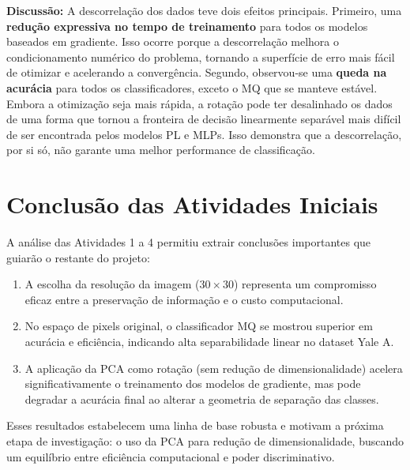 \documentclass[a4paper,12pt]{article}
\begin{document}
\noindent\textbf{Discussão:} A descorrelação dos dados teve dois efeitos principais. Primeiro, uma \textbf{redução expressiva no tempo de treinamento} para todos os modelos baseados em gradiente. Isso ocorre porque a descorrelação melhora o condicionamento numérico do problema, tornando a superfície de erro mais fácil de otimizar e acelerando a convergência. Segundo, observou-se uma \textbf{queda na acurácia} para todos os classificadores, exceto o MQ que se manteve estável. Embora a otimização seja mais rápida, a rotação pode ter desalinhado os dados de uma forma que tornou a fronteira de decisão linearmente separável mais difícil de ser encontrada pelos modelos PL e MLPs. Isso demonstra que a descorrelação, por si só, não garante uma melhor performance de classificação.

\section{Conclusão das Atividades Iniciais}

A análise das Atividades 1 a 4 permitiu extrair conclusões importantes que guiarão o restante do projeto:
\begin{enumerate}
    \item A escolha da resolução da imagem (\(30\times 30\)) representa um compromisso eficaz entre a preservação de informação e o custo computacional.
    \item No espaço de pixels original, o classificador MQ se mostrou superior em acurácia e eficiência, indicando alta separabilidade linear no dataset Yale A.
    \item A aplicação da PCA como rotação (sem redução de dimensionalidade) acelera significativamente o treinamento dos modelos de gradiente, mas pode degradar a acurácia final ao alterar a geometria de separação das classes.
\end{enumerate}
Esses resultados estabelecem uma linha de base robusta e motivam a próxima etapa de investigação: o uso da PCA para redução de dimensionalidade, buscando um equilíbrio entre eficiência computacional e poder discriminativo.
\end{document}
